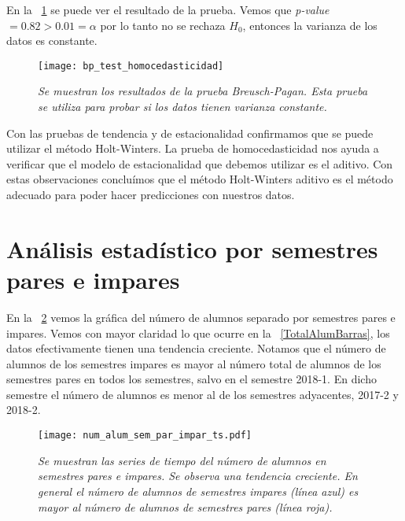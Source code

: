 En la \figurename{~\ref{bpTest_homocedasticidad}} se puede ver el resultado de la prueba. Vemos que \textit{p-value} $ = 0.82 > 0.01 = \alpha$ por lo tanto no se rechaza $H_{0}$, entonces la varianza de los datos es constante.


\begin{figure}[H]
\centering
\texttt{[image: bp\_test\_homocedasticidad]} %
\caption[\textit{Prueba Breusch-Pagan para homocedasticidad}]{\textit{Se muestran los resultados de la prueba Breusch-Pagan. Esta prueba se utiliza para probar si los datos tienen varianza constante.}}\label{bpTest_homocedasticidad}
\end{figure}


Con las pruebas de tendencia y de estacionalidad confirmamos que se puede utilizar el método Holt-Winters. La prueba de homocedasticidad nos ayuda a verificar que el modelo de estacionalidad que debemos utilizar es el aditivo. Con estas observaciones concluímos que el método Holt-Winters aditivo es el método adecuado para poder hacer predicciones con nuestros datos.

\section{Análisis estadístico por semestres pares e impares} \label{Sec_AE_x_semestres}

En la \figurename{~\ref{NumAlTotal_ParImpar_ts}} vemos la gráfica del número de alumnos separado por semestres pares e impares. Vemos con mayor claridad lo que ocurre en la \figurename{~\ref{TotalAlumBarras}}, los datos efectivamente tienen una tendencia creciente. Notamos que el número de alumnos de los semestres impares es mayor al número total de alumnos de los semestres pares en todos los semestres, salvo en el semestre 2018-1. En dicho semestre el número de alumnos es menor al de los semestres adyacentes, 2017-2 y 2018-2.

\begin{figure}[H]
\centering
\texttt{[image: num\_alum\_sem\_par\_impar\_ts.pdf]} %
\caption[\textit{Número de alumnos de semestres pares e impares}]{\textit{Se muestran las series de tiempo del número de alumnos en semestres pares e impares. Se observa una tendencia creciente. En general el número de alumnos de semestres impares (línea azul) es mayor al número de alumnos de semestres pares (línea roja).}}\label{NumAlTotal_ParImpar_ts}
\end{figure}


